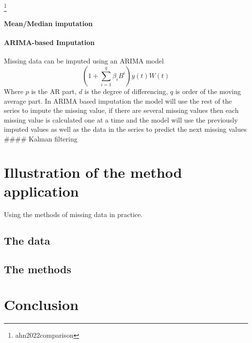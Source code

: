 \documentclass[
]{report}
\begin{document}
\footnote{ahn2022comparison}

\hypertarget{meanmedian-imputation}{%
\subsubsection{Mean/Median imputation}\label{meanmedian-imputation}}

\hypertarget{arima-based-imputation}{%
\subsubsection{ARIMA-based Imputation}\label{arima-based-imputation}}

Missing data can be imputed using an ARIMA model
\[\left(1+ \sum_{i=1}^q \beta_i B^i\right)y(t)W(t)\] Where \(p\) is the
AR part, \(d\) is the degree of differencing, \(q\) is order of the
moving average part. In ARIMA based imputation the model will use the
rest of the series to impute the missing value, if there are several
missing values then each missing value is calculated one at a time and
the model will use the previously imputed values as well as the data in
the series to predict the next missing values \#\#\#\# Kalman filtering

\hypertarget{illustration-of-the-method-application}{%
\chapter{Illustration of the method
application}\label{illustration-of-the-method-application}}

Using the methods of missing data in practice.

\hypertarget{the-data}{%
\section{The data}\label{the-data}}

\hypertarget{the-methods}{%
\section{The methods}\label{the-methods}}

\hypertarget{conclusion}{%
\chapter{Conclusion}\label{conclusion}}
\end{document}
